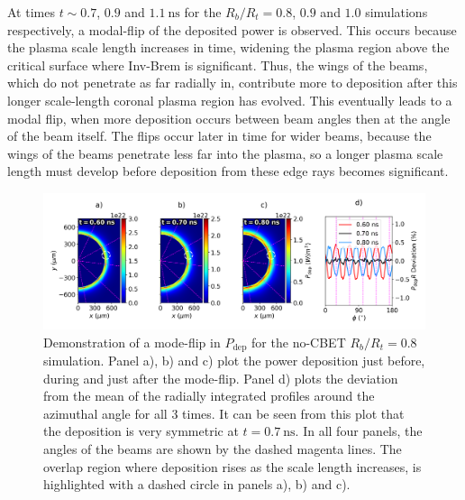 At times $t\sim0.7$, $0.9$ and $1.1\ \text{ns}$ for the $R_b/R_t=0.8$, $0.9$ and $1.0$ simulations respectively, a modal-flip of the deposited power is observed.
This occurs because the plasma scale length increases in time, widening the plasma region above the critical surface where \ac{Inv-Brem} is significant.
Thus, the wings of the beams, which do not penetrate as far radially in, contribute more to deposition after this longer scale-length coronal plasma region has evolved.
This eventually leads to a modal flip, when more deposition occurs between beam angles then at the angle of the beam itself.
The flips occur later in time for wider beams, because the wings of the beams penetrate less far into the plasma, so a longer plasma scale length must develop before deposition from these edge rays becomes significant.

\begin{figure}[t!]
    \includegraphics[width=\linewidth]{Results1/Images/NoCBET_modeflip.png}
    \centering
    \caption{Demonstration of a mode-flip in $P_{\text{dep}}$ for the no-\ac{CBET} $R_b/R_t=0.8$ simulation.
    Panel a), b) and c) plot the power deposition just before, during and just after the mode-flip.
    Panel d) plots the deviation from the mean of the radially integrated profiles around the azimuthal angle for all 3 times.
    It can be seen from this plot that the deposition is very symmetric at $t=0.7\ \text{ns}$.
    In all four panels, the angles of the beams are shown by the dashed magenta lines.
    The overlap region where deposition rises as the scale length increases, is highlighted with a dashed circle in panels a), b) and c).}%
    \label{fig:Res1_Deposition_change}
\end{figure}

